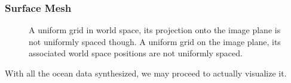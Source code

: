 \subsubsection{Surface Mesh}
%
\begin{figure}
\centering
{}
\caption[The uniform grid and the projected grid.]{
A uniform grid in world space, its projection onto the image plane is not
uniformly spaced though.
A uniform grid on the image plane, its associated world space positions
are not uniformly spaced.
}
\label{fig:dprojectedgrid}
\end{figure}
%
With all the ocean data synthesized, we may proceed to actually visualize it.

